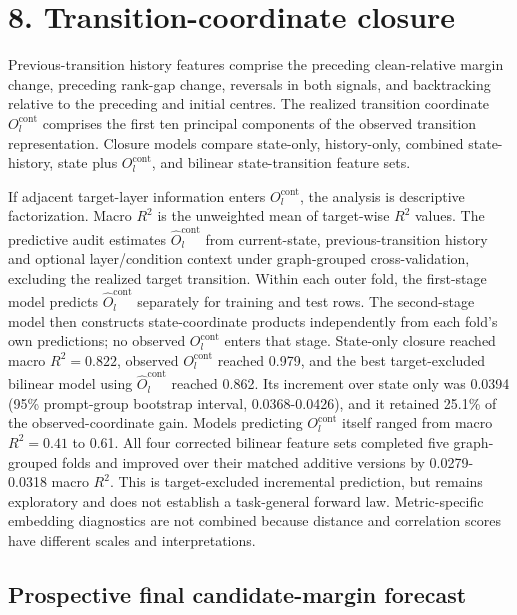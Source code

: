 \documentclass[10pt]{article}
\begin{document}
\section*{8. Transition-coordinate closure}

Previous-transition history features comprise the preceding clean-relative margin change, preceding rank-gap change, reversals in both signals, and backtracking relative to the preceding and initial centres. The realized transition coordinate \(O_l^{\mathrm{cont}}\) comprises the first ten principal components of the observed transition representation. Closure models compare state-only, history-only, combined state-history, state plus \(O_l^{\mathrm{cont}}\), and bilinear state-transition feature sets.

If adjacent target-layer information enters \(O_l^{\mathrm{cont}}\), the analysis is descriptive factorization. Macro \(R^2\) is the unweighted mean of target-wise \(R^2\) values. The predictive audit estimates \(\hat O_l^{\mathrm{cont}}\) from current-state, previous-transition history and optional layer/condition context under graph-grouped cross-validation, excluding the realized target transition. Within each outer fold, the first-stage model predicts \(\hat O_l^{\mathrm{cont}}\) separately for training and test rows. The second-stage model then constructs state-coordinate products independently from each fold's own predictions; no observed \(O_l^{\mathrm{cont}}\) enters that stage. State-only closure reached macro \(R^2=0.822\), observed \(O_l^{\mathrm{cont}}\) reached 0.979, and the best target-excluded bilinear model using \(\hat O_l^{\mathrm{cont}}\) reached 0.862. Its increment over state only was 0.0394 (95\% prompt-group bootstrap interval, 0.0368-0.0426), and it retained 25.1\% of the observed-coordinate gain. Models predicting \(O_l^{\mathrm{cont}}\) itself ranged from macro \(R^2=0.41\) to 0.61. All four corrected bilinear feature sets completed five graph-grouped folds and improved over their matched additive versions by 0.0279-0.0318 macro \(R^2\). This is target-excluded incremental prediction, but remains exploratory and does not establish a task-general forward law. Metric-specific embedding diagnostics are not combined because distance and correlation scores have different scales and interpretations.

\subsection*{Prospective final candidate-margin forecast}
\end{document}
